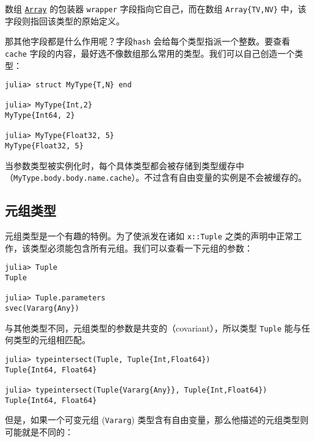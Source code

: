 数组 \hyperlink{15492651498431872487}{\texttt{Array}} 的包装器 \texttt{wrapper} 字段指向它自己，而在数组 \texttt{Array\{TV,NV\}} 中，该字段则指回该类型的原始定义。



那其他字段都是什么作用呢？字段\texttt{hash} 会给每个类型指派一个整数。要查看 \texttt{cache} 字段的内容，最好选不像数组那么常用的类型。我们可以自己创造一个类型：




\begin{verbatim}
julia> struct MyType{T,N} end

julia> MyType{Int,2}
MyType{Int64, 2}

julia> MyType{Float32, 5}
MyType{Float32, 5}
\end{verbatim}



当参数类型被实例化时，每个具体类型都会被存储到类型缓存中（\texttt{MyType.body.body.name.cache}）。不过含有自由变量的实例是不会被缓存的。



\hypertarget{5158816437121320312}{}


\subsection{元组类型}



元组类型是一个有趣的特例。为了使派发在诸如 \texttt{x::Tuple} 之类的声明中正常工作，该类型必须能包含所有元组。我们可以查看一下元组的参数：




\begin{verbatim}
julia> Tuple
Tuple

julia> Tuple.parameters
svec(Vararg{Any})
\end{verbatim}



与其他类型不同，元组类型的参数是共变的（covariant），所以类型 \texttt{Tuple} 能与任何类型的元组相匹配。




\begin{verbatim}
julia> typeintersect(Tuple, Tuple{Int,Float64})
Tuple{Int64, Float64}

julia> typeintersect(Tuple{Vararg{Any}}, Tuple{Int,Float64})
Tuple{Int64, Float64}
\end{verbatim}



但是，如果一个可变元组 (\texttt{Vararg}) 类型含有自由变量，那么他描述的元组类型则可能就是不同的：




